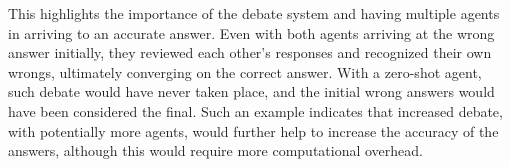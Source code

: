 This highlights the importance of the debate system and having multiple agents in arriving to an accurate answer. Even with both agents arriving at the wrong answer initially, they reviewed each other's responses and recognized their own wrongs, ultimately converging on the correct answer. With a zero-shot agent, such debate would have never taken place, and the initial wrong answers would have been considered the final. Such an example indicates that increased debate, with potentially more agents, would further help to increase the accuracy of the answers, although this would require more computational overhead.

